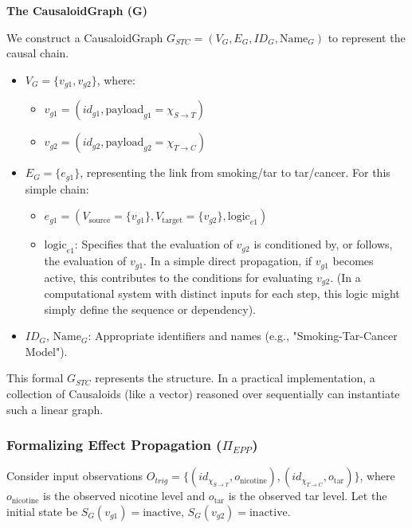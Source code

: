 \textbf{The CausaloidGraph (G)}
        
We construct a CausaloidGraph \(G_{STC} = (V_G, E_G, ID_G, \text{Name}_G)\) to represent the causal chain.
        \begin{itemize}
            \item \(V_G = \{v_{g1}, v_{g2}\}\), where:
                \begin{itemize}
                    \item \(v_{g1} = (id_{g1}, \text{payload}_{g1} = \chi_{S \to T})\)
                    \item \(v_{g2} = (id_{g2}, \text{payload}_{g2} = \chi_{T \to C})\)
                \end{itemize}
            \item \(E_G = \{e_{g1}\}\), representing the link from smoking/tar to tar/cancer. For this simple chain:
                \begin{itemize}
                    \item \(e_{g1} = (V_{\text{source}} = \{v_{g1}\}, V_{\text{target}} = \{v_{g2}\}, \text{logic}_{e1})\)
                    \item \(\text{logic}_{e1}\): Specifies that the evaluation of \(v_{g2}\) is conditioned by, or follows, the evaluation of \(v_{g1}\). In a simple direct propagation, if \(v_{g1}\) becomes active, this contributes to the conditions for evaluating \(v_{g2}\). (In a computational system with distinct inputs for each step, this logic might simply define the sequence or dependency).
                \end{itemize}
            \item \(ID_G\), \(\text{Name}_G\): Appropriate identifiers and names (e.g., "Smoking-Tar-Cancer Model").
        \end{itemize}
        This formal \(G_{STC}\) represents the structure. In a practical implementation, a collection of Causaloids (like a vector) reasoned over sequentially can instantiate such a linear graph.

    \subsubsection{Formalizing Effect Propagation (\(\Pi_{EPP}\))}
    \label{ssec:example_epp_propagation}

    Consider input observations \(O_{trig} = \{ (id_{\chi_{S \to T}}, o_{\text{nicotine}}), (id_{\chi_{T \to C}}, o_{\text{tar}}) \}\), where \(o_{\text{nicotine}}\) is the observed nicotine level and \(o_{\text{tar}}\) is the observed tar level.
    Let the initial state be \(S_G(v_{g1})=\text{inactive}\), \(S_G(v_{g2})=\text{inactive}\).
    
